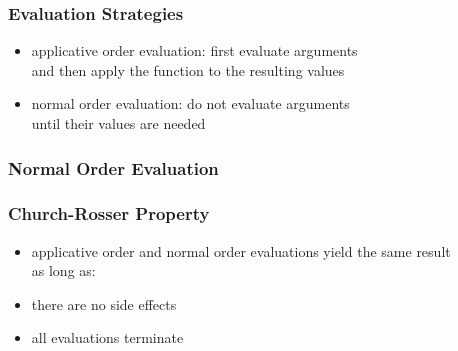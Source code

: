 \documentclass[dvipsnames]{beamer}
\theoremstyle{plain}
\begin{document}
\begin{frame}
  \frametitle{Evaluation Strategies}

  \begin{itemize}
    \item \alert{applicative order evaluation}: first evaluate arguments\\
      and then apply the function to the resulting values

    \pause
    \medskip
    \item \alert{normal order evaluation}: do not evaluate arguments\\
      until their values are needed
  \end{itemize}
\end{frame}

\begin{frame}[fragile]
  \frametitle{Normal Order Evaluation}

  \begin{example}

    \pause
    \medskip

    \pause
    \medskip

    \pause
    \medskip

    \pause
    \medskip

    \pause
    \medskip

    \pause
    \medskip

    \pause
    \medskip

    \pause
    \medskip
  \end{example}
\end{frame}

\begin{frame}
  \frametitle{Church-Rosser Property}

  \begin{itemize}
    \item applicative order and normal order evaluations yield the same result\\
      as long as:

    \bigskip
    \item there are no side effects
    \item all evaluations terminate
  \end{itemize}
\end{frame}
\end{document}

